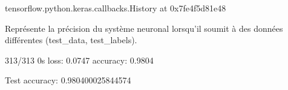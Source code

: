 \documentclass[letterpaper,10pt,french]{sphinxmanual}
\begin{document}
\begin{sphinxVerbatim}[commandchars=\\\{\}]
\PYGZlt{}tensorflow.python.keras.callbacks.History at 0x7fe4f5d81e48\PYGZgt{}
\end{sphinxVerbatim}

Représente la précision du système neuronal lorsqu’il soumit à des données différentes (test\_data, test\_labels).

\begin{sphinxVerbatim}[commandchars=\\\{\}]
      

 
\end{sphinxVerbatim}

\begin{sphinxVerbatim}[commandchars=\\\{\}]
313/313 \PYGZhy{} 0s \PYGZhy{} loss: 0.0747 \PYGZhy{} accuracy: 0.9804

Test accuracy: 0.980400025844574
\end{sphinxVerbatim}

\begin{sphinxVerbatim}[commandchars=\\\{\}]
\end{sphinxVerbatim}
\end{document}
